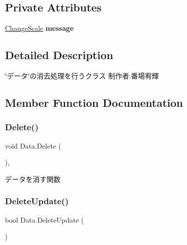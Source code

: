 \subsection*{Private Attributes}
\begin{DoxyCompactItemize}
\item 
\mbox{\label{class_data_af646fb3191783b26c983e579b38828e1}} 
\hyperlink{class_change_scale}{Change\+Scale} {\bfseries message}
\end{DoxyCompactItemize}


\subsection{Detailed Description}
\char`\"{}データ\char`\"{}の消去処理を行うクラス 制作者\+:番場宥輝 



\subsection{Member Function Documentation}
\mbox{\label{class_data_a7ca377572bce52bd389a9c3612222f14}} 
\subsubsection{\texorpdfstring{Delete()}{Delete()}}
{\footnotesize\ttfamily void Data.\+Delete (\begin{DoxyParamCaption}{ }\end{DoxyParamCaption})\hspace{0.3cm}{\ttfamily [inline]}, {\ttfamily [private]}}



データを消す関数 

\mbox{\label{class_data_a74ae220d24ccbc1a1c4022f0177f186b}} 
\subsubsection{\texorpdfstring{Delete\+Update()}{DeleteUpdate()}}
{\footnotesize\ttfamily bool Data.\+Delete\+Update (\begin{DoxyParamCaption}{ }\end{DoxyParamCaption})\hspace{0.3cm}{\ttfamily [inline]}}



